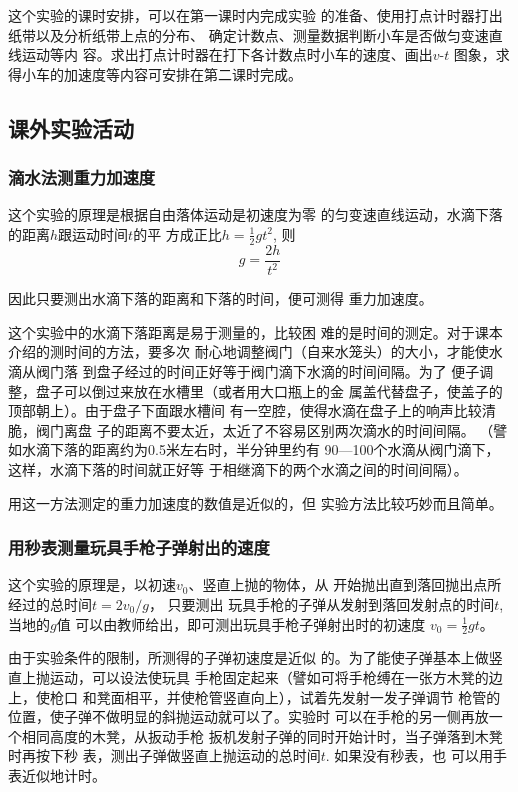 这个实验的课时安排，可以在第一课时内完成实验
的准备、使用打点计时器打出纸带以及分析纸带上点的分布、
确定计数点、测量数据判断小车是否做匀变速直线运动等内
容。求出打点计时器在打下各计数点时小车的速度、画出$v$-$t$
图象，求得小车的加速度等内容可安排在第二课时完成。

\subsection{课外实验活动}
\subsubsection{滴水法测重力加速度}
这个实验的原理是根据自由落体运动是初速度为零
的匀变速直线运动，水滴下落的距离$h$跟运动时间$t$的平
方成正比$h=\frac{1}{2}gt^2$, 则 
\[g=\frac{2h}{t^2}\]

因此只要测出水滴下落的距离和下落的时间，便可测得
重力加速度。

这个实验中的水滴下落距离是易于测量的，比较困
难的是时间的测定。对于课本介绍的测时间的方法，要多次
耐心地调整阀门（自来水笼头）的大小，才能使水滴从阀门落
到盘子经过的时间正好等于阀门滴下水滴的时间间隔。为了
便子调整，盘子可以倒过来放在水槽里（或者用大口瓶上的金
属盖代替盘子，使盖子的顶部朝上）。由于盘子下面跟水槽间
有一空腔，使得水滴在盘子上的响声比较清脆，阀门离盘
子的距离不要太近，太近了不容易区别两次滴水的时间间隔。
（譬如水滴下落的距离约为0.5米左右时，半分钟里约有
90—100个水滴从阀门滴下，这样，水滴下落的时间就正好等
于相继滴下的两个水滴之间的时间间隔）。

用这一方法测定的重力加速度的数值是近似的，但
实验方法比较巧妙而且简单。

\subsubsection{用秒表测量玩具手枪子弹射出的速度}
这个实验的原理是，以初速$v_0$、竖直上抛的物体，从
开始抛出直到落回抛出点所经过的总时间$t=2v_0/g$，
只要测出
玩具手枪的子弹从发射到落回发射点的时间$t$, 当地的$g$值
可以由教师给出，即可测出玩具手枪子弹射出时的初速度
$v_0=\frac{1}{2}gt$。

由于实验条件的限制，所测得的子弹初速度是近似
的。为了能使子弹基本上做竖直上抛运动，可以设法使玩具
手枪固定起来（譬如可将手枪缚在一张方木凳的边上，使枪口
和凳面相平，并使枪管竖直向上），试着先发射一发子弹调节
枪管的位置，使子弹不做明显的斜抛运动就可以了。实验时
可以在手枪的另一侧再放一个相同高度的木凳，从扳动手枪
扳机发射子弹的同时开始计时，当子弹落到木凳时再按下秒
表，测出子弹做竖直上抛运动的总时间$t$. 如果没有秒表，也
可以用手表近似地计时。

